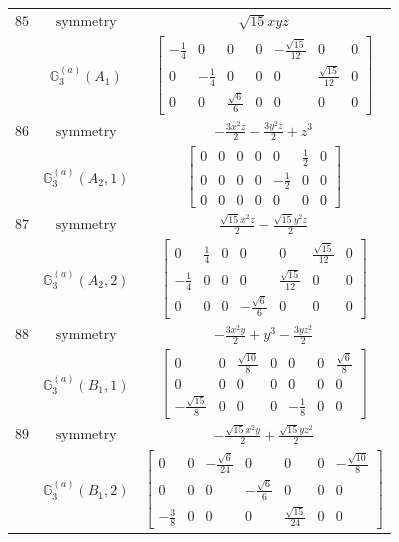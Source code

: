 \documentclass[fleqn,8pt,landscape]{jsarticle}
\begin{document}
\begin{longtable}{ccc}
$ 85 $ & $ \text{symmetry} $ & $ \sqrt{15} x y z $ \\
$  $ & $ \mathbb{G}_{3}^{(a)}(A_{1}) $ & $ \begin{bmatrix} - \frac{1}{4} & 0 & 0 & 0 & - \frac{\sqrt{15}}{12} & 0 & 0 \\ 0 & - \frac{1}{4} & 0 & 0 & 0 & \frac{\sqrt{15}}{12} & 0 \\ 0 & 0 & \frac{\sqrt{6}}{6} & 0 & 0 & 0 & 0 \end{bmatrix} $ \\ \hline
$ 86 $ & $ \text{symmetry} $ & $ - \frac{3 x^{2} z}{2} - \frac{3 y^{2} z}{2} + z^{3} $ \\
$  $ & $ \mathbb{G}_{3}^{(a)}(A_{2},1) $ & $ \begin{bmatrix} 0 & 0 & 0 & 0 & 0 & \frac{1}{2} & 0 \\ 0 & 0 & 0 & 0 & - \frac{1}{2} & 0 & 0 \\ 0 & 0 & 0 & 0 & 0 & 0 & 0 \end{bmatrix} $ \\ \hline
$ 87 $ & $ \text{symmetry} $ & $ \frac{\sqrt{15} x^{2} z}{2} - \frac{\sqrt{15} y^{2} z}{2} $ \\
$  $ & $ \mathbb{G}_{3}^{(a)}(A_{2},2) $ & $ \begin{bmatrix} 0 & \frac{1}{4} & 0 & 0 & 0 & \frac{\sqrt{15}}{12} & 0 \\ - \frac{1}{4} & 0 & 0 & 0 & \frac{\sqrt{15}}{12} & 0 & 0 \\ 0 & 0 & 0 & - \frac{\sqrt{6}}{6} & 0 & 0 & 0 \end{bmatrix} $ \\ \hline
$ 88 $ & $ \text{symmetry} $ & $ - \frac{3 x^{2} y}{2} + y^{3} - \frac{3 y z^{2}}{2} $ \\
$  $ & $ \mathbb{G}_{3}^{(a)}(B_{1},1) $ & $ \begin{bmatrix} 0 & 0 & \frac{\sqrt{10}}{8} & 0 & 0 & 0 & \frac{\sqrt{6}}{8} \\ 0 & 0 & 0 & 0 & 0 & 0 & 0 \\ - \frac{\sqrt{15}}{8} & 0 & 0 & 0 & - \frac{1}{8} & 0 & 0 \end{bmatrix} $ \\ \hline
$ 89 $ & $ \text{symmetry} $ & $ - \frac{\sqrt{15} x^{2} y}{2} + \frac{\sqrt{15} y z^{2}}{2} $ \\
$  $ & $ \mathbb{G}_{3}^{(a)}(B_{1},2) $ & $ \begin{bmatrix} 0 & 0 & - \frac{\sqrt{6}}{24} & 0 & 0 & 0 & - \frac{\sqrt{10}}{8} \\ 0 & 0 & 0 & - \frac{\sqrt{6}}{6} & 0 & 0 & 0 \\ - \frac{3}{8} & 0 & 0 & 0 & \frac{\sqrt{15}}{24} & 0 & 0 \end{bmatrix} $ \\ \hline

\end{longtable}
\end{document}
